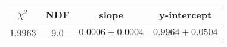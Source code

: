 \begin{tabular}{|c|c|c|c|}

\hline
$\chi^{2}$ & NDF & slope & y-intercept  \\
\hline
1.9963 & 9.0 & $0.0006\pm0.0004$ & $0.9964\pm0.0504$ \\
\hline

\end{tabular}